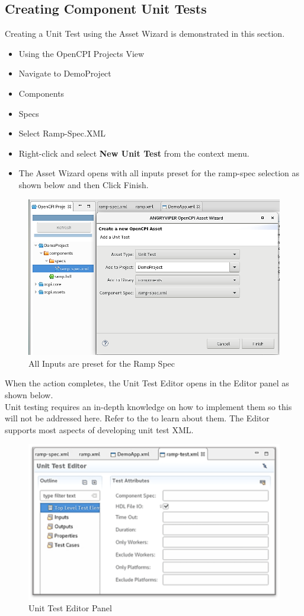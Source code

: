 \documentclass[10pt, a4paper, oneside]{article}
\begin{document}
\subsection{Creating Component Unit Tests}
Creating a Unit Test using the Asset Wizard is demonstrated in this section.
\begin{itemize}
\item	Using the OpenCPI Projects View
\item	Navigate to DemoProject
\item	Components
\item	Specs
\item	Select Ramp-Spec.XML
\item	Right-click and select \textbf{New Unit Test} from the context menu.
\item The Asset Wizard opens with all inputs preset for the ramp-spec selection as shown below and then Click Finish.
\end{itemize}
\begin{figure}[h!]
	\centering
	\caption{All Inputs are preset for the Ramp Spec}{}
	\includegraphics[width=.65\textwidth]{InputsarePresetfortheRampSpec.png}
 \end{figure}
When the action completes, the Unit Test Editor opens in the Editor panel as shown below. \\

Unit testing requires an in-depth knowledge on how to implement them so this will not be addressed here. Refer to the  to learn about them.
The Editor supports most aspects of developing unit test XML.\\

\begin{figure}[h!]
	\centering
	\caption{Unit Test Editor Panel}{}
	\includegraphics[width=.65\textwidth]{UnitTestEditorPanel.png}
 \end{figure}
\end{document}
